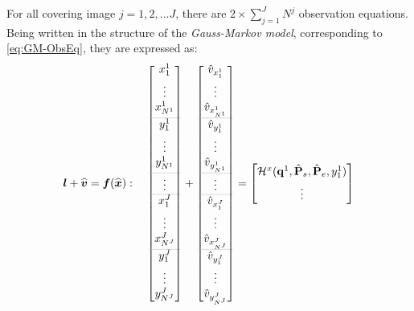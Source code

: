For all covering image $j=1,2,...J$, there are $2\times\displaystyle\sum_{j=1}^{J}N^j$ observation equations. Being written in the structure of the \textit{Gauss-Markov model}, corresponding to \cref{eq:GM-ObsEq}, they are expressed as:
\begin{equation} \label{eq:obsvec-allcam}
\boldsymbol l+\widehat{\boldsymbol v}=\boldsymbol f(\widehat{\boldsymbol x}):\quad
\begin{bmatrix}
 x^1_1\\[0.3em]
 \vdots\\
 x^1_{N^1}\\[0.3em]
 \arrayrulecolor{lightgray} \hline
 y^1_1\\[0.3em]
 \vdots\\
 y^1_{N^1}\\[0.3em]
 \arrayrulecolor{lightgray} \hline
 \vdots\\
 \arrayrulecolor{lightgray} \hline
 x^J_1\\[0.3em]
 \vdots\\
 x^J_{N^J}\\[0.3em]
 \arrayrulecolor{lightgray} \hline
 y^J_1\\[0.3em]
 \vdots\\
 y^J_{N^J}\\[0.3em]
\end{bmatrix}
+
\begin{bmatrix}
 \hat{v}_{x^1_1}\\[0.3em]
 \vdots\\
 \hat{v}_{x^1_{N^1}}\\[0.3em]
 \arrayrulecolor{lightgray} \hline
 \hat{v}_{y^1_1}\\[0.3em]
 \vdots\\
 \hat{v}_{y^1_{N^1}}\\[0.3em]
 \arrayrulecolor{lightgray} \hline
 \vdots\\
 \arrayrulecolor{lightgray} \hline
 \hat{v}_{x^J_1}\\[0.3em]
 \vdots\\
 \hat{v}_{x^J_{N^J}}\\[0.3em]
 \arrayrulecolor{lightgray} \hline
 \hat{v}_{y^J_1}\\[0.3em]
 \vdots\\
 \hat{v}_{y^J_{N^J}}\\[0.3em]
\end{bmatrix}
=
\begin{bmatrix}
 \mathcal{H}^x(\mathbf{q}^1,\hat{\mathbf{P}}_s,\hat{\mathbf{P}}_e,y^1_1)\\[0.3em]
 \vdots\\

\end{bmatrix}
\end{equation}

